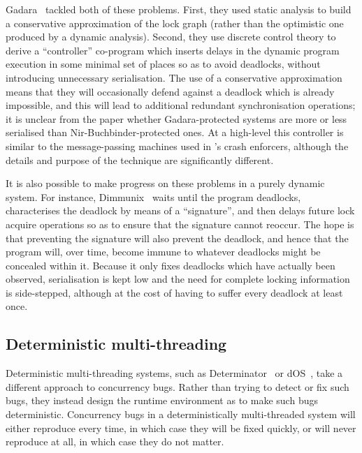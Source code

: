 Gadara~\cite{FFFWang2008} tackled both of these problems.  First, they
used static analysis to build a conservative approximation of the lock
graph (rather than the optimistic one produced by a dynamic analysis).
Second, they use discrete control theory to derive a ``controller''
co-program which inserts delays in the dynamic program execution in
some minimal set of places so as to avoid deadlocks, without
introducing unnecessary serialisation.  The use of a conservative
approximation means that they will occasionally defend against a
deadlock which is already impossible, and this will lead to additional
redundant synchronisation operations; it is unclear from the paper
whether Gadara-protected systems are more or less serialised than
Nir-Buchbinder-protected ones.  At a high-level this controller is
similar to the message-passing machines used in {\technique}'s crash
enforcers, although the details and purpose of the technique are
significantly different.

It is also possible to make progress on these problems in a purely
dynamic system.  For instance, Dimmunix~\cite{Jula2008} waits until
the program deadlocks, characterises the deadlock by means of a
``signature'', and then delays future lock acquire operations so as to
ensure that the signature cannot reoccur.  The hope is that preventing
the signature will also prevent the deadlock, and hence that the
program will, over time, become immune to whatever deadlocks might be
concealed within it.  Because it only fixes deadlocks which have
actually been observed, serialisation is kept low and the need for
complete locking information is side-stepped, although at the cost of
having to suffer every deadlock at least once.

\subsection{Deterministic multi-threading}

Deterministic multi-threading systems, such as
Determinator~\cite{Aviram2010} or dOS~\cite{Bergan2010}, take a
different approach to concurrency bugs.  Rather than trying to detect
or fix such bugs, they instead design the runtime environment as to
make such bugs deterministic.  Concurrency bugs in a deterministically
multi-threaded system will either reproduce every time, in which case
they will be fixed quickly, or will never reproduce at all, in which
case they do not matter.

